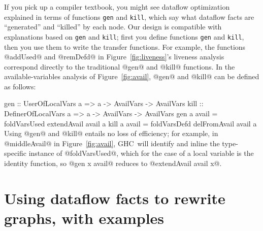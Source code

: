 \documentclass[blockstyle,preprint,nocopyrightspace]{sigplanconf}
\newenvironment{smallcode}{\par\unskip\small\verbatim}{\endverbatim}
\newcommand{\authornote}[1]{{\em #1}}
\def\authornote#1{\unskip\relax}
\newcommand{\norman}[1]{\authornote{NR: #1}}
\let\remark\norman
\newcommand\seclabel[1]{\label{sec:#1}}
\newcommand\figref[1]{Figure~\ref{fig:#1}}
\begin{document}
\remark{I've tried to rewrite this section without the abstract guff;
Simon, can you let us know what you think?}


\seclabel{gen-kill}

If you pick up a compiler textbook, you might see dataflow
optimization explained in terms of functions \texttt{gen} and \texttt{kill},
which say what dataflow facts are ``generated'' and
``killed'' by each node.
Our design is compatible with explanations based on \texttt{gen} and
\texttt{kill};
first you define functions \texttt{gen} and \texttt{kill}, then you
use them to write the transfer functions.
\remark{I tried to repair @smallcode@ so as not to affect
line spacing in the previous~\P.}
For example, the functions @addUsed@ and @remDefd@ in \figref{liveness}'s
liveness analysis correspond directly to the traditional @gen@ and
@kill@ functions.
In the available-variables analysis of \figref{avail}, @gen@ and
@kill@ can be defined as follows:
\begin{smallcode}
gen  :: UserOfLocalVars    a => a -> AvailVars -> AvailVars
kill :: DefinerOfLocalVars a => a -> AvailVars -> AvailVars
gen  a avail = foldVarsUsed extendAvail  avail a
kill a avail = foldVarsDefd delFromAvail avail a
\end{smallcode}
Using @gen@ and @kill@ entails no loss of efficiency;
for example, in @middleAvail@ in \figref{avail}, GHC~will identify and
inline the type-specific instance of @foldVarsUsed@, which for the
case of a local variable is the identity function, so @gen x avail@
reduces to @extendAvail avail x@.

\fi

\section{Using dataflow facts to rewrite graphs, with examples}

\seclabel{rewrites}

\remark{Orphaned text:
Analyzing a subgraph also uses a non-bottom entry fact.
For example, if a rewrite function proposes to replace 
@z = x + y@ with @z = 7 + y@, an analysis will be run on the one-node
graph @z = 7 + y@ with input fact
$@x == 7@ \land @y == 8@$.
}
\end{document}
